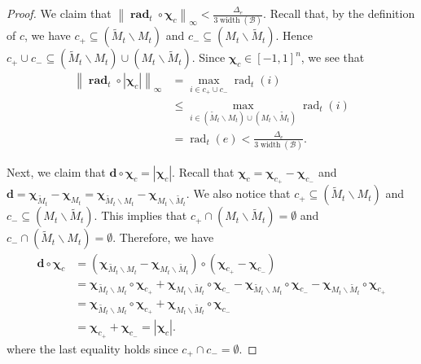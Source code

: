 \documentclass{article}
\newcommand{\B}{\mathcal B}
\newcommand{\del}{\backslash}
\DeclareMathOperator{\rank}{width}
\DeclareMathOperator{\rad}{rad}
\newcommand{\nor}[1]{\left\|#1\right\|}
\renewcommand{\vec}[1]{\boldsymbol{#1}}
\renewcommand{\odot}{\circ}
\begin{document}
\begin{spacing}{1.1}
\begin{proof}
We claim that $\nor{\vec \rad_t \odot \vec \chi_c}_\infty < \frac{\Delta_e}{3\rank(\B)}$.
Recall that, by the definition of $c$, we have
$c_+\subseteq (\tilde M_t \del M_t)$ and $c_-\subseteq (M_t\del \tilde M_t)$. 
Hence $c_+\cup c_- \subseteq  (\tilde M_t \del M_t)\cup (M_t\del \tilde M_t)$.
Since $\vec \chi_c \in [-1,1]^n$, we see that 
\begin{align}
\nor{\vec \rad_t \odot |\vec \chi_c|}_\infty &= \max_{i\in  c_+\cup c_-} \rad_t(i) \nonumber \\
									    &\le \max_{i\in  (\tilde M_t \del M_t)\cup (M_t\del \tilde M_t)} \rad_t(i)  \nonumber \\
									    &= \rad_t(e) < \frac{\Delta_e}{3\rank(\B)} \label{eq:u-c-1-0-1}.
\end{align}


Next, we claim that $\vec d \odot \vec \chi_c = |\vec \chi_c|$.
Recall that $\vec\chi_c = \vec\chi_{c_+}-\vec\chi_{c_-}$
and $\vec d = \vec \chi_{\tilde M_t}-\vec \chi_{M_t} = \vec\chi_{\tilde M_t\del M_t} - \vec\chi_{M_t\del \tilde M_t}$.
We also notice that $c_+ \subseteq (\tilde M_t \del M_t)$ and $c_- \subseteq (M_t \del \tilde M_t)$.
This implies that $c_+ \cap (M_t \del \tilde M_t) = \emptyset$ and $c_-\cap (\tilde M_t \del M_t) = \emptyset$.
Therefore, we have
\begin{align*}
\vec d \odot \vec \chi_c &= (\vec\chi_{\tilde M_t\del M_t} - \vec\chi_{M_t\del \tilde M_t})\odot(\vec\chi_{c_+}-\vec\chi_{c_-})\\
&= \vec\chi_{\tilde M_t\del M_t}\odot \vec\chi_{c_+}+
   \vec\chi_{M_t \del \tilde M_t}\odot \vec\chi_{c_-}-
   \vec\chi_{\tilde M_t\del M_t}\odot \vec\chi_{c_-}-
   \vec\chi_{M_t\del \tilde M_t}\odot \vec\chi_{c_+}\\
&= \vec\chi_{\tilde M_t\del M_t}\odot \vec\chi_{c_+}+
   \vec\chi_{M_t \del \tilde M_t}\odot \vec\chi_{c_-} \\
&= \vec\chi_{c_+}+\vec\chi_{c_-} =|\vec\chi_c|. 
\end{align*}
where the last equality holds since $c_+\cap c_- =\emptyset$.


\end{proof}
\end{spacing}
\end{document}
